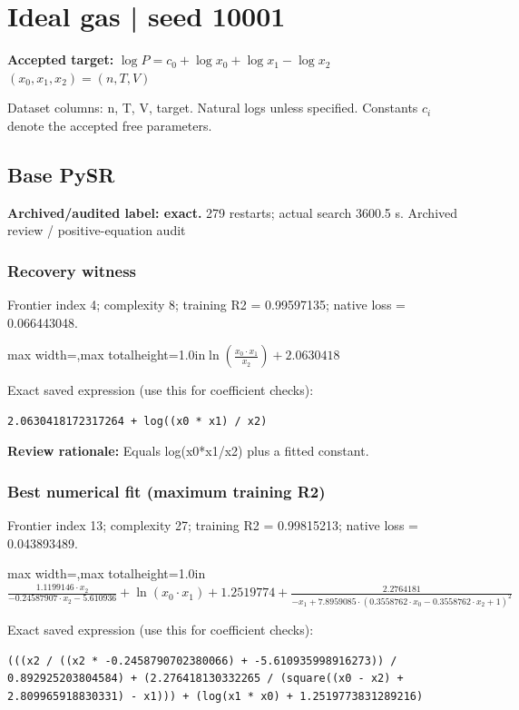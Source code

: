 \documentclass[10pt,letterpaper,landscape]{article}
\begin{document}
\section*{Ideal gas | seed 10001}
\textbf{Accepted target:} $\displaystyle \log P=c_0+\log x_0+\log x_1-\log x_2$\hfill $(x_0,x_1,x_2)=(n,T,V)$\par
{\small Dataset columns: n, T, V, target. Natural logs unless specified. Constants $c_i$ denote the accepted free parameters.}\par\medskip
\begin{minipage}[t]{0.485\textwidth}
\subsection*{Base PySR}
\textbf{Archived/audited label: exact.} 279 restarts; actual search 3600.5 s.
{\small Archived review / positive-equation audit}
\subsubsection*{Recovery witness}
Frontier index 4; complexity 8; training R2 = 0.99597135; native loss = 0.066443048.
\begin{center}\begin{adjustbox}{max width=\linewidth,max totalheight=1.0in}$\displaystyle \ln{\left(\frac{x_{0} \cdot x_{1}}{x_{2}} \right)} + 2.0630418$\end{adjustbox}\end{center}
{\scriptsize Exact saved expression (use this for coefficient checks):}
\begin{lstlisting}
2.0630418172317264 + log((x0 * x1) / x2)
\end{lstlisting}
{\small\textbf{Review rationale:} Equals log(x0*x1/x2) plus a fitted constant.}
\subsubsection*{Best numerical fit (maximum training R2)}
Frontier index 13; complexity 27; training R2 = 0.99815213; native loss = 0.043893489.
\begin{center}\begin{adjustbox}{max width=\linewidth,max totalheight=1.0in}$\displaystyle \frac{1.1199146 \cdot x_{2}}{- 0.24587907 \cdot x_{2} - 5.610936} + \ln{\left(x_{0} \cdot x_{1} \right)} + 1.2519774 + \frac{2.2764181}{- x_{1} + 7.8959085 \cdot \left(0.3558762 \cdot x_{0} - 0.3558762 \cdot x_{2} + 1\right)^{2}}$\end{adjustbox}\end{center}
{\scriptsize Exact saved expression (use this for coefficient checks):}
\begin{lstlisting}
(((x2 / ((x2 * -0.2458790702380066) + -5.610935998916273)) / 0.892925203804584) + (2.276418130332265 / (square((x0 - x2) + 2.809965918830331) - x1))) + (log(x1 * x0) + 1.2519773831289216)
\end{lstlisting}
\end{minipage}\hfill
\end{document}
